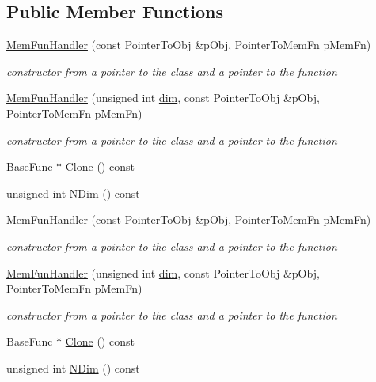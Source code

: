 \subsection*{Public Member Functions}
\begin{DoxyCompactItemize}
\item 
\mbox{\hyperlink{classROOT_1_1Math_1_1MemFunHandler_a714877219c36aab344b3785be06affcc}{Mem\+Fun\+Handler}} (const Pointer\+To\+Obj \&p\+Obj, Pointer\+To\+Mem\+Fn p\+Mem\+Fn)
\begin{DoxyCompactList}\small\item\em constructor from a pointer to the class and a pointer to the function \end{DoxyCompactList}\item 
\mbox{\hyperlink{classROOT_1_1Math_1_1MemFunHandler_ae160c1f60f6681ba29ce9e2bf3654b24}{Mem\+Fun\+Handler}} (unsigned int \mbox{\hyperlink{irrep__util_8cc_a70b5e28b5bc3d1b63a7435c5fe50b837}{dim}}, const Pointer\+To\+Obj \&p\+Obj, Pointer\+To\+Mem\+Fn p\+Mem\+Fn)
\begin{DoxyCompactList}\small\item\em constructor from a pointer to the class and a pointer to the function \end{DoxyCompactList}\item 
Base\+Func $\ast$ \mbox{\hyperlink{classROOT_1_1Math_1_1MemFunHandler_a71089a87a2f1ca482d176caca602f16c}{Clone}} () const
\item 
unsigned int \mbox{\hyperlink{classROOT_1_1Math_1_1MemFunHandler_a6685da729cc491d0ee9b3857a400d98c}{N\+Dim}} () const
\item 
\mbox{\hyperlink{classROOT_1_1Math_1_1MemFunHandler_a714877219c36aab344b3785be06affcc}{Mem\+Fun\+Handler}} (const Pointer\+To\+Obj \&p\+Obj, Pointer\+To\+Mem\+Fn p\+Mem\+Fn)
\begin{DoxyCompactList}\small\item\em constructor from a pointer to the class and a pointer to the function \end{DoxyCompactList}\item 
\mbox{\hyperlink{classROOT_1_1Math_1_1MemFunHandler_ae160c1f60f6681ba29ce9e2bf3654b24}{Mem\+Fun\+Handler}} (unsigned int \mbox{\hyperlink{irrep__util_8cc_a70b5e28b5bc3d1b63a7435c5fe50b837}{dim}}, const Pointer\+To\+Obj \&p\+Obj, Pointer\+To\+Mem\+Fn p\+Mem\+Fn)
\begin{DoxyCompactList}\small\item\em constructor from a pointer to the class and a pointer to the function \end{DoxyCompactList}\item 
Base\+Func $\ast$ \mbox{\hyperlink{classROOT_1_1Math_1_1MemFunHandler_a71089a87a2f1ca482d176caca602f16c}{Clone}} () const
\item 
unsigned int \mbox{\hyperlink{classROOT_1_1Math_1_1MemFunHandler_a6685da729cc491d0ee9b3857a400d98c}{N\+Dim}} () const
\end{DoxyCompactItemize}


